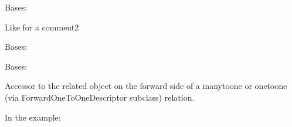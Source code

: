 \documentclass[letterpaper,10pt,english]{sphinxmanual}
\begin{document}
\begin{fulllineitems}
\label{\detokenize{forums:forums.models.LikeComment2}}
Bases: {\hyperref[\detokenize{forums:forums.models.AbstractLike}]{}}

Like for a comment2

\begin{fulllineitems}
\label{\detokenize{forums:forums.models.LikeComment2.DoesNotExist}}
Bases: 

\end{fulllineitems}


\begin{fulllineitems}
\label{\detokenize{forums:forums.models.LikeComment2.MultipleObjectsReturned}}
Bases: 

\end{fulllineitems}


\begin{fulllineitems}
\label{\detokenize{forums:forums.models.LikeComment2.comment2}}
Accessor to the related object on the forward side of a many\sphinxhyphen{}to\sphinxhyphen{}one or
one\sphinxhyphen{}to\sphinxhyphen{}one (via ForwardOneToOneDescriptor subclass) relation.

In the example:

\begin{sphinxVerbatim}[commandchars=\\\{\}]
 
       
\end{sphinxVerbatim}


\end{fulllineitems}
\end{fulllineitems}
\end{document}
